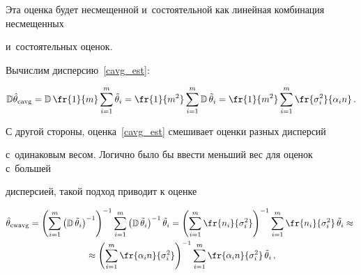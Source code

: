 \vspace*{-2pt}





\noindent


Эта оценка будет несмещенной и~состоятельной как линейная комбинация несмещенных 


и~состоятельных оценок.








Вычислим дисперсию~\eqref{cavg_est}:


$$


\mathbb{D}\hat{\theta}_{\mathrm{cavg}} = 


\mathbb{D}\,\fr{1}{m}\sum\limits_{i=1}^m\tilde{\theta}_i = 


\fr{1}{m^2}\sum\limits_{i=1}^m\mathbb{D}\,\tilde{\theta}_i = 


\fr{1}{m^2}\sum\limits_{i=1}^m \fr{\sigma_i^2}{\alpha_i n}\,.


$$











С другой стороны, оценка~\eqref{cavg_est} смешивает оценки разных дисперсий 


с~одинаковым весом. Логично было бы ввести меньший вес для оценок с~большей 


дисперсией, такой подход приводит к оценке





\noindent


\begin{multline}


\label{cwavg_est}


\hat{\theta}_{\mathrm{cwavg}} = \left(\sum\limits_{i=1}^m 


\left(\mathbb{D}\,\tilde{\theta}_i\right)^{-1}\right)^{-1} \sum\limits_{i=1}^m 


\left(\mathbb{D}\,\tilde{\theta}_i\right)^{-1} \tilde{\theta}_i


= \left(\sum\limits_{i=1}^m \fr{n_i}{\sigma_i^2}\right)^{-1} 


\sum\limits_{i=1}^m \fr{n_i}{\sigma_i^2} \,\tilde{\theta}_i \approx{} \\


{}\approx \left(\sum\limits_{i=1}^m \fr{\alpha_i n}{\sigma_i^2}\right)^{-1} 


\sum\limits_{i=1}^m \fr{\alpha_i n}{\sigma_i^2} \,\tilde{\theta}_i\,,


\end{multline}


